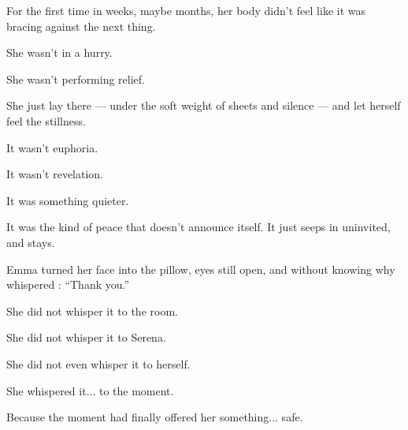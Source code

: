 For the first time in weeks, maybe months, her body didn’t feel like it was bracing against the 
next thing.

She wasn’t in a hurry.

She wasn’t performing relief.

She just lay there --- under the soft weight of sheets and silence --- and let herself feel the 
stillness.

It wasn’t euphoria.

It wasn’t revelation.

It was something quieter.

It was the kind of peace that doesn’t announce itself. It just seeps in uninvited, and stays.

Emma turned her face into the pillow, eyes still open, and without knowing why whispered
: ``Thank you.''

She did not whisper it to the room.

She did not whisper it to Serena.

She did not even whisper it to herself.

She whispered it... to the moment.

Because the moment had finally offered her something... safe.

\medskip 

